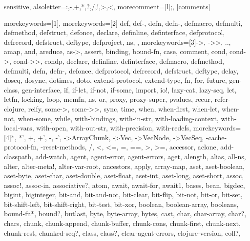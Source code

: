 \usepackage{listings}
\usepackage{color}
\usepackage{xcolor}

{sensitive, %
 alsoletter={:,-,+,*,?,/,!,>,<}, %
 morecomment=[l]{;}, %
}[comments]

%
{%
 morekeywords=[1]{},
 morekeywords=[2]{%
   def, def-, defn, defn-, defmacro, defmulti, defmethod, %
   defstruct, defonce, declare, definline, definterface, %
   defprotocol, defrecord, defstruct, deftype, defproject, ns, %
 }, %
 morekeywords=[3]{->, ->>, .., amap, and, areduce, as->, assert, binding, %
   bound-fn, case, comment, cond, cond->, cond->>, condp, declare, definline, %
   definterface, defmacro, defmethod, defmulti, defn, defn-, defonce, %
   defprotocol, defrecord, defstruct, deftype, delay, doseq, dosync, dotimes, %
   doto, extend-protocol, extend-type, fn, for, future, gen-class, %
   gen-interface, if, if-let, if-not, if-some, import, io!, lazy-cat, lazy-seq, let, %
   letfn, locking, loop, memfn, ns, or, proxy, proxy-super, pvalues, %
   recur, refer-clojure, reify, some->, some->>, sync, time, when, when-first, %
   when-let, when-not, when-some, while, with-bindings, with-in-str, %
   with-loading-context, with-local-vars, with-open, with-out-str, %
   with-precision, with-redefs}, %
  morekeywords=[4]{*, *', +, +', -, -', ->ArrayChunk, ->Vec, ->VecNode, %
    ->VecSeq, -cache-protocol-fn, -reset-methods, /, <, <=, =, ==, >, >=, %
    accessor, aclone, add-classpath, add-watch, agent, agent-error, %
    agent-errors, aget, alength, alias, all-ns, alter, alter-meta!, %
    alter-var-root, ancestors, apply, array-map, aset, aset-boolean, aset-byte, %
    aset-char, aset-double, aset-float, aset-int, aset-long, aset-short, assoc, %
    assoc!, assoc-in, associative?, atom, await, await-for, await1, bases, bean, %
    bigdec, bigint, biginteger, bit-and, bit-and-not, bit-clear, bit-flip, %
    bit-not, bit-or, bit-set, bit-shift-left, bit-shift-right, bit-test, %
    bit-xor, boolean, boolean-array, booleans, bound-fn*, bound?, butlast, byte, %
    byte-array, bytes, cast, char, char-array, char?, chars, chunk, %
    chunk-append, chunk-buffer, chunk-cons, chunk-first, chunk-next, chunk-rest, %
    chunked-seq?, class, class?, clear-agent-errors, clojure-version, coll?, %
}}
